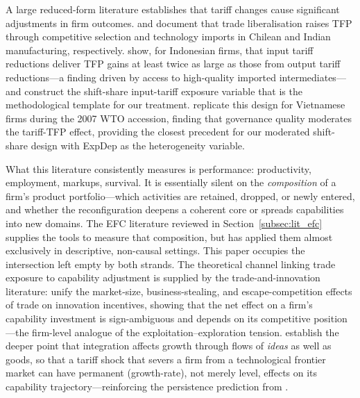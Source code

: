 A large reduced-form literature establishes that tariff changes cause significant
adjustments in firm outcomes. \citet{pavcnik2002} and \citet{topalova2011} document
that trade liberalisation raises TFP through competitive selection and technology
imports in Chilean and Indian manufacturing, respectively. \citet{amiti2007} show,
for Indonesian firms, that input tariff reductions deliver TFP gains at least twice as
large as those from output tariff reductions---a finding driven by access to high-quality
imported intermediates---and construct the shift-share input-tariff exposure variable that is
the methodological template for our treatment. \citet{tomasi2022} replicate this
design for Vietnamese firms during the 2007 WTO accession, finding that governance
quality moderates the tariff-TFP effect, providing the closest precedent for our
moderated shift-share design with ExpDep as the heterogeneity variable.

What this literature consistently measures is performance: productivity, employment,
markups, survival. It is essentially silent on the \emph{composition} of a firm's
product portfolio---which activities are retained, dropped, or newly entered, and
whether the reconfiguration deepens a coherent core or spreads capabilities into
new domains. The EFC literature reviewed in Section~\ref{subsec:lit_efc} supplies
the tools to measure that composition, but has applied them almost exclusively in
descriptive, non-causal settings. This paper occupies the intersection left empty
by both strands. The theoretical channel linking trade exposure to capability
adjustment is supplied by the trade-and-innovation literature: \citet{akcigit2022}
unify the market-size, business-stealing, and escape-competition effects of trade on
innovation incentives, showing that the net effect on a firm's capability investment
is sign-ambiguous and depends on its competitive position---the firm-level analogue of
the exploitation--exploration tension. \citet{riverabatiz1991} establish the deeper
point that integration affects growth through flows of \emph{ideas} as well as goods,
so that a tariff shock that severs a firm from a technological frontier market can have
permanent (growth-rate), not merely level, effects on its capability trajectory---reinforcing the
persistence prediction from \citet{storper1992}.

